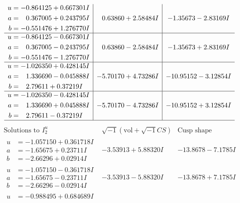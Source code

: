\documentclass[1p]{elsarticle_modified}
\theoremstyle{definition}
\newcommand{\I}{\sqrt{-1}}
\begin{document}
$$\begin{array}{c|c|c}
\begin{aligned}
u &= -0.864125 + 0.667301 I \\
a &= \phantom{-}0.367005 + 0.243795 I \\
b &= -0.551476 + 1.276770 I\end{aligned}
 & \phantom{-}0.63860 + 2.58484 I & -1.35673 - 2.83169 I \\ \hline\begin{aligned}
u &= -0.864125 - 0.667301 I \\
a &= \phantom{-}0.367005 - 0.243795 I \\
b &= -0.551476 - 1.276770 I\end{aligned}
 & \phantom{-}0.63860 - 2.58484 I & -1.35673 + 2.83169 I \\ \hline\begin{aligned}
u &= -1.026350 + 0.428145 I \\
a &= \phantom{-}1.336690 - 0.045888 I \\
b &= \phantom{-}2.79611 + 0.37219 I\end{aligned}
 & -5.70170 + 4.73286 I & -10.95152 - 3.12854 I \\ \hline\begin{aligned}
u &= -1.026350 - 0.428145 I \\
a &= \phantom{-}1.336690 + 0.045888 I \\
b &= \phantom{-}2.79611 - 0.37219 I\end{aligned}
 & -5.70170 - 4.73286 I & -10.95152 + 3.12854 I\\
 \hline 
 \end{array}$$\newpage$$\begin{array}{c|c|c}  
\text{Solutions to }I^u_{2}& \I (\text{vol} + \sqrt{-1}CS) & \text{Cusp shape}\\
 \hline 
\begin{aligned}
u &= -1.057150 + 0.361718 I \\
a &= -1.65675 + 0.23711 I \\
b &= -2.66296 + 0.02914 I\end{aligned}
 & -3.53913 + 5.88320 I & -13.8678 - 7.1785 I \\ \hline\begin{aligned}
u &= -1.057150 - 0.361718 I \\
a &= -1.65675 - 0.23711 I \\
b &= -2.66296 - 0.02914 I\end{aligned}
 & -3.53913 - 5.88320 I & -13.8678 + 7.1785 I \\ \hline\begin{aligned}
u &= -0.988495 + 0.684689 I \\

\end{aligned}
\end{array}$$
\end{document}
